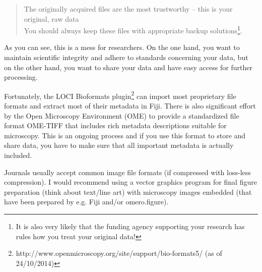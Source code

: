 \begin{quotation}
	The originally acquired files are the most trustworthy -- this is your original, raw data\\You should always keep these files with appropriate backup solutions\footnote{It is also very likely that the funding agency supporting your research has rules how you treat your original data!}.
\end{quotation}

As you can see, this is a mess for researchers. On the one hand, you want to maintain scientific integrity and adhere to standards concerning your data, but on the other hand, you want to share your data and have easy access for further processing.

Fortunately, the LOCI Bioformats plugin\footnote{http://www.openmicroscopy.org/site/support/bio-formats5/ (as of 24/10/2014)} can import most proprietary file formats and extract most of their metadata in Fiji. There is also significant effort by the Open Microscopy Environment (OME) to provide a standardized file format OME-TIFF that includes rich metadata descriptions suitable for microscopy. This is an ongoing process and if you use this format to store and share data, you have to make sure that all important metadata is actually included.

Journals usually accept common image file formats (if compressed with
loss-less compression). I would recommend using a vector graphics
program for final figure preparation (think about text/line art) with
microscopy images embedded (that have been prepared by e.g. Fiji and/or omero.figure).

